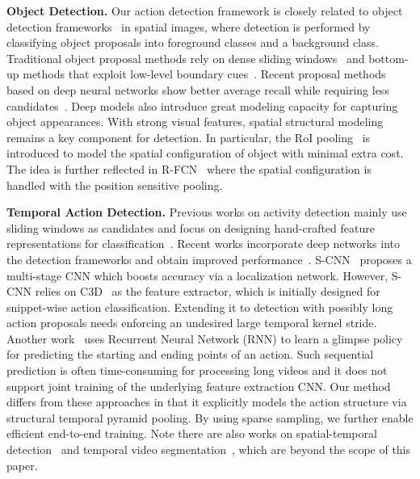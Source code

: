 \documentclass[10pt,twocolumn,letterpaper]{article}
\begin{document}
\noindent \textbf{Object Detection.}
Our action detection framework is closely related to object detection frameworks~\cite{Felzenszwalb2010DPM,Girshick2014RCNN,Ren2015FasterRCNN} in spatial images, where detection is performed by classifying object proposals into foreground classes and a background class.
Traditional object proposal methods rely on dense sliding windows~\cite{Felzenszwalb2010DPM} and bottom-up methods that exploit low-level boundary cues~\cite{Van2011SS,Dollar2014Edgebox}.
Recent proposal methods based on deep neural networks show better average recall while requiring less candidates~\cite{Ren2015FasterRCNN}.
Deep models also introduce great modeling capacity for capturing object appearances.
With strong visual features, spatial structural modeling~\cite{Lazebnik2006Beyond} remains a key component for detection.
In particular, the RoI pooling~\cite{Girshick2015FRCNN} is introduced to model the spatial configuration of object with minimal extra cost.
The idea is further reflected in R-FCN~\cite{Li2016RFCN} where the spatial configuration is handled with the position sensitive pooling.

\noindent \textbf{Temporal Action Detection.}
Previous works on activity detection mainly use sliding windows as candidates
and focus on designing hand-crafted feature representations for classification~\cite{Gaidon2013Actom,Tang2013RightFeature,Oneata2013FV,Mettes2015Bofrag,Yuan2016ScorePyramids,JainCVPR14Tubelet}.
Recent works incorporate deep networks into the detection frameworks and obtain improved performance~\cite{Yeung2016FrameGlimpse,Shou2016SCNN,de2016online}.
S-CNN~\cite{Shou2016SCNN} proposes a multi-stage CNN which boosts accuracy via a localization network.
However, S-CNN relies on C3D~\cite{Tran15C3D} as the feature extractor,
which is initially designed for snippet-wise action classification.
Extending it to detection with possibly long action proposals needs
enforcing an undesired large temporal kernel stride.
Another work~\cite{Yeung2016FrameGlimpse} uses Recurrent Neural Network (RNN) to learn a glimpse policy for predicting the starting and ending points of an action.
Such sequential prediction is often time-consuming for processing long videos and
it does not support joint training of the underlying feature extraction CNN.
Our method differs from these approaches in that
it explicitly models the action structure via structural temporal pyramid pooling.
By using sparse sampling, we further enable efficient end-to-end training.
Note there are also works on spatial-temporal detection~\cite{Gkioxari2015Tubes,Weinzaepfel2015Track,mettes2016spot,Wang2016Actionness,Peng2016ActionFRCNN} and
temporal video segmentation~\cite{Hoai2011Joint},
which are beyond the scope of this paper.
 
\end{document}
